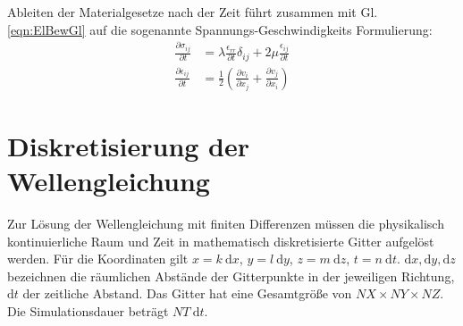 \documentclass[pdftex,a4paper,parskip,listof=totoc,bibliography=totoc,onehalfspacing,12pt]{scrreprt}
\begin{document}
Ableiten der Materialgesetze nach der Zeit führt zusammen mit Gl. \ref{eqn:ElBewGl} auf die sogenannte Spannungs-Geschwindigkeits Formulierung:
\begin{align}
	\frac{\partial\sigma_{ij}}{\partial t} &= \lambda \frac{\epsilon_{rr}}{\partial t} \delta_{ij} + 2 \mu \frac{\epsilon_{ij}}{\partial t}\label{eqn:GenHookdt}\\
	\frac{\partial\epsilon_{ij}}{\partial t} &= \frac{1}{2} \left( \frac{\partial v_i}{\partial x_j} + \frac{\partial v_j}{\partial x_i} \right)\label{eqn:Dehnijdt}
\end{align}

\chapter{Diskretisierung der Wellengleichung}
Zur Lösung der Wellengleichung mit finiten Differenzen müssen die physikalisch kontinuierliche Raum und Zeit in mathematisch diskretisierte Gitter aufgelöst werden. Für die Koordinaten gilt $x=k~\mathrm{d}x$, $y=l~\mathrm{d}y$, $z=m~\mathrm{d}z$, $t=n~\mathrm{d}t$. $\mathrm{d}x, \mathrm{d}y, \mathrm{d}z$ bezeichnen die räumlichen Abstände der Gitterpunkte in der jeweiligen Richtung, $\mathrm{d}t$ der zeitliche Abstand. Das Gitter hat eine Gesamtgröße von $NX \times NY \times NZ$. Die Simulationsdauer beträgt $NT~\mathrm{d}t$.
\end{document}
